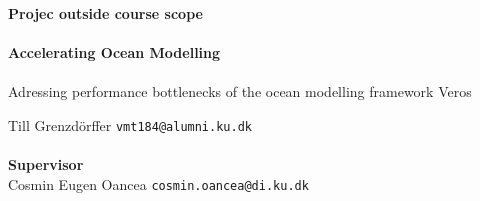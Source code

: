 \documentclass[a4paper,oneside]{memoir}
\begin{document}
    \thispagestyle{empty}
    \begin{adjustwidth}{-3cm}{-1.5cm}
    \vspace*{-1cm}
    \textbf{\Huge Projec outside course scope} \\
    \vspace*{2.5cm} \\
    \textbf{\Huge Accelerating Ocean Modelling} \\
    \vspace*{.1cm} \\
    {\huge Adressing performance bottlenecks of the ocean modelling framework Veros} \\
    \begin{tabbing}
    Till Grenzdörffer \hspace{1cm} \= \texttt{vmt184@alumni.ku.dk} \\
    \\[12cm]
    \textbf{\Large Supervisor} \\
    Cosmin Eugen Oancea \> \texttt{cosmin.oancea@di.ku.dk} \\
    \end{tabbing}
    \end{adjustwidth}
    \newpage
    \ClearWallPaper


\iffalse %
\end{document}

